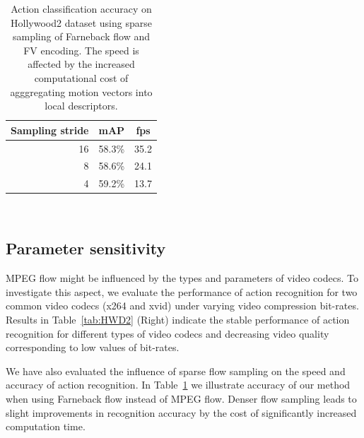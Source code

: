 \documentclass[10pt,twocolumn,letterpaper]{article}
\begin{document}
\begin{table}
\begin{center}
\vspace{-.1cm}
\begin{tabular}{|r|c|c|}
\hline
Sampling stride & mAP & fps \\\hline
16  	& 58.3\% & 35.2	\\\hline
8	& 58.6\% & 24.1	\\\hline
4     	& 59.2\% & 13.7	\\\hline
\end{tabular}
\mbox{}\vspace{.2cm}\\
\caption{Action classification accuracy on Hollywood2 dataset using sparse sampling of Farneback flow and FV encoding. The speed is affected by the increased computational cost of agggregating motion vectors into local descriptors.\vspace{-.4cm}}
\label{tab:flow_resample}
\end{center}
\end{table}

\subsection{Parameter sensitivity}
MPEG flow might be influenced by the types and parameters of video codecs. To investigate this aspect, we evaluate the performance of action recognition for two common video codecs (x264 and xvid) under varying video compression bit-rates. Results in Table~\ref{tab:HWD2} (Right) indicate the stable performance of action recognition for different types of video codecs and decreasing video quality corresponding to low values of bit-rates. 

We have also evaluated the influence of sparse flow sampling on the speed and accuracy of action recognition. In Table~\ref{tab:flow_resample} we illustrate accuracy of our method when using Farneback flow instead of MPEG flow. Denser flow sampling leads to slight improvements in recognition accuracy by the cost of significantly increased computation time.
\end{document}
